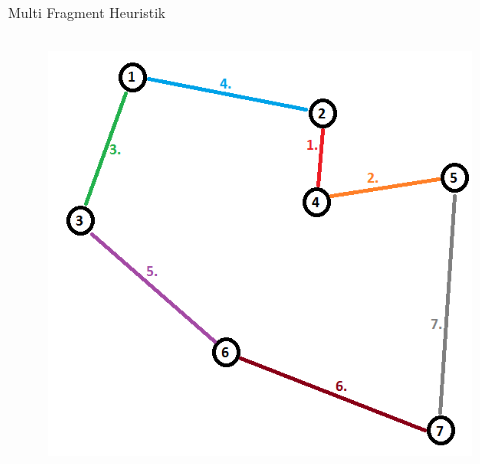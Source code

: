 \begin{frame}{Multi Fragment Heuristik}
\begin{columns}
\begin{column}{0.5\textwidth}
\begin{figure}
            \includegraphics[scale=0.30]{Multi_fragment.png}
        \end{figure}
  	  \end{column}
  \end{columns}
\end{frame}